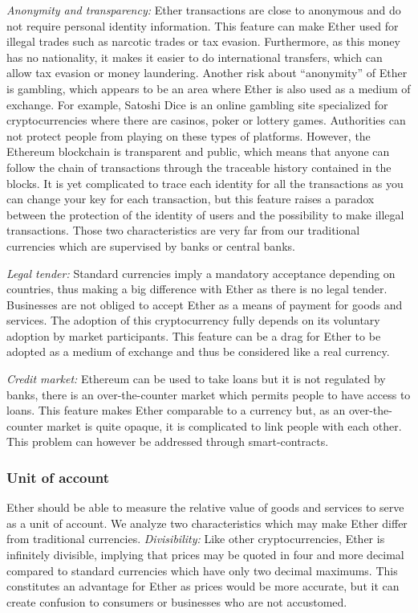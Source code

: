 \documentclass[11pt]{report}
\begin{document}
\textit{Anonymity and transparency:} Ether transactions are close to anonymous and do not require personal identity information. This feature can make Ether used for illegal trades such as narcotic trades or tax evasion. Furthermore, as this money has no nationality, it makes it easier to do international transfers, which can allow tax evasion or money laundering. Another risk about “anonymity” of Ether is gambling, which appears to be an area where Ether is also used as a medium of exchange. For example, Satoshi Dice is an online gambling site specialized for cryptocurrencies where there are casinos, poker or lottery games.  Authorities can not protect people from playing on these types of platforms. However, the Ethereum blockchain is transparent and public, which means that anyone can follow the chain of transactions through the traceable history contained in the blocks. It is yet complicated to trace each identity for all the transactions as you can change your key for each transaction, but this feature raises a paradox between the protection of the identity of users and the possibility to make illegal transactions. Those two characteristics are very far from our traditional currencies which are supervised by banks or central banks.\smallbreak

 \textit{Legal tender:} Standard currencies imply a mandatory acceptance depending on countries, thus making a big difference with Ether as there is no legal tender. Businesses are not obliged to accept Ether as a means of payment for goods and services. The adoption of this cryptocurrency fully depends on its voluntary adoption by market participants. This feature can be a drag for Ether to be adopted as a medium of exchange and thus be considered like a real currency.\smallbreak
 
 \textit{Credit market:} Ethereum can be used to take loans but it is not regulated by banks, there is an over-the-counter market which permits people to have access to loans. This feature makes Ether comparable to a currency but, as an over-the-counter market is quite opaque, it is complicated to link people with each other. This problem can however be addressed through smart-contracts.\smallbreak
 
 \subsubsection*{Unit of account}
 
Ether should be able to measure the relative value of goods and services to serve as a unit of account. We analyze two characteristics which may make Ether differ from traditional currencies.\smallbreak
 \textit{Divisibility:} Like other cryptocurrencies, Ether is infinitely divisible, implying that prices may be quoted in four and more decimal compared to standard currencies which have only two decimal maximums. This constitutes an advantage for Ether as prices would be more accurate, but it can create confusion to consumers or businesses who are not accustomed.  \smallbreak
 
\end{document}
